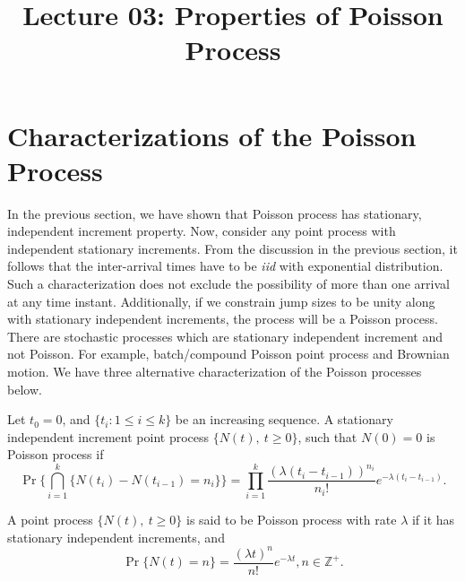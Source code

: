 \documentclass[a4paper,10pt,english]{article}
\title{Lecture 03: Properties of Poisson Process}
\author{}
\begin{document}
\maketitle

\section{Characterizations of the Poisson Process}

In the previous section, we have shown that Poisson process has stationary, independent increment property. Now, consider any point process with independent stationary increments. From the discussion in the previous section, it follows that the inter-arrival times have to be \emph{iid} with exponential distribution. Such a characterization does not exclude the possibility of more than one arrival at any time instant. Additionally, if we constrain jump sizes to be unity along with stationary independent increments, the process will be a Poisson process. There are stochastic processes which are stationary independent increment and not Poisson. For example, batch/compound Poisson point process and Brownian motion. We have three alternative characterization of the Poisson processes below. 

\begin{defn}\label{defn:SIIJoint} Let $t_0 = 0$, and $\{t_i: 1 \leq i \leq k\}$ be an increasing sequence. A stationary independent increment point process $\{N(t),~t\geqslant 0\}$, such that $N(0) = 0$ is Poisson process if 
\begin{equation*}
  \Pr\{\bigcap_{i=1}^k \{N(t_i)-N(t_{i-1})= n_{i}\}\} = \prod_{i=1}^{k}\frac{(\lambda(t_{i}-t_{i-1}))^{n_{i}}}{n_{i}!} e^{-\lambda (t_{i}-t_{i-1})}.
\end{equation*}
\end{defn}

\begin{defn}\label{defn:SIIMarginal} A point process $\{N(t),~t\geqslant 0\}$ is said to be Poisson process with rate $\lambda$ if it has stationary independent increments, and 
\begin{equation*}
\Pr\{N(t)=n\}= \frac{(\lambda t)^{n}}{n!} e^{-\lambda t}, n\in \mathbb{Z}^+.
\end{equation*}
\end{defn}
\end{document}
